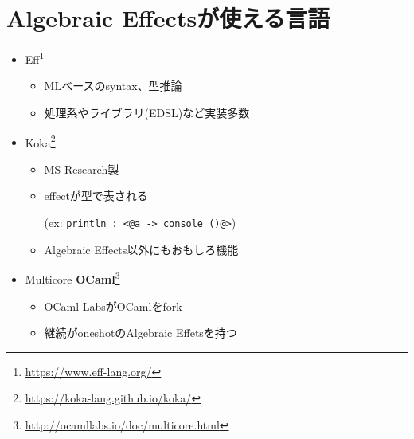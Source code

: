 \documentclass[unicode,compress,14pt,CJK%
\directlua{
    handout = os.getenv"HANDOUT"
    local _ = handout and tex.print(",handout")
},t]{beamer}
\begin{document}
\section{Algebraic Effectsが使える言語}
\begin{frame}[fragile]
    \frametitlesec

    \begin{itemize}
        \item Eff\footnote{\url{https://www.eff-lang.org/}}

            \begin{itemize}
                \item MLベースのsyntax、型推論
                \item 処理系やライブラリ(EDSL)など実装多数
            \end{itemize}

        \item Koka\footnote{\url{https://koka-lang.github.io/koka/}}

            \begin{itemize}
                \item MS Research製
                \item effectが型で表される

                    (ex: \lstinline{println : <@a -> console ()@>})
                \item Algebraic Effects以外にもおもしろ機能
            \end{itemize}

        \item Multicore \textbf{OCaml}\footnote{\url{http://ocamllabs.io/doc/multicore.html}}

            \begin{itemize}
                \item OCaml LabsがOCamlをfork
                \item 継続が\alert{oneshot}のAlgebraic Effetsを持つ
            \end{itemize}
    \end{itemize}
\end{frame}
\end{document}
